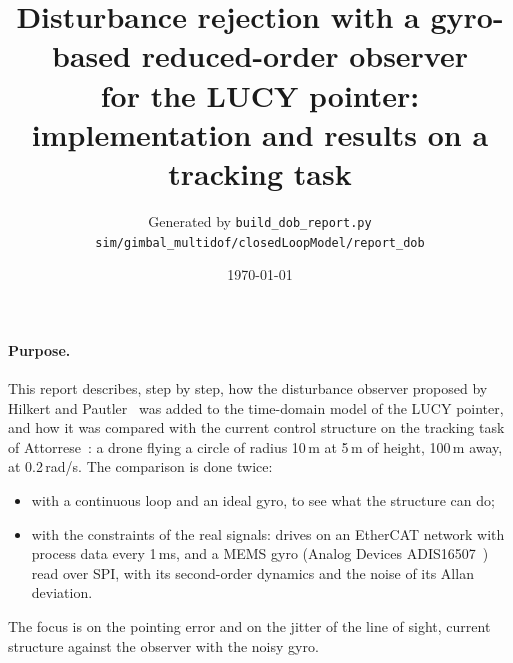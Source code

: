 \documentclass[10pt,a4paper]{article}
\title{Disturbance rejection with a gyro-based reduced-order observer\\ for the LUCY pointer: implementation and results on a tracking task}
\author{Generated by \texttt{build\_dob\_report.py}\\ \small\texttt{sim/gimbal\_multidof/closedLoopModel/report\_dob}}
\date{\today}
\numberwithin{equation}{section}
\begin{document}
\maketitle

\paragraph{Purpose.} This report describes, step by step, how the disturbance observer proposed by Hilkert and Pautler~\cite{hilkert2011} was added to the time-domain model of the LUCY pointer, and how it was compared with the current control structure on the tracking task of Attorrese~\cite{attorrese2026}: a drone flying a circle of radius 10\,m at 5\,m of height, 100\,m away, at 0.2\,rad/s. The comparison is done twice:
\begin{itemize}
\item with a continuous loop and an ideal gyro, to see what the structure can do;
\item with the constraints of the real signals: drives on an EtherCAT network with process data every 1\,ms, and a MEMS gyro (Analog Devices ADIS16507~\cite{adis16507}) read over SPI, with its second-order dynamics and the noise of its Allan deviation.
\end{itemize}
The focus is on the pointing error and on the jitter of the line of sight, current structure against the observer with the noisy gyro.
\end{document}
